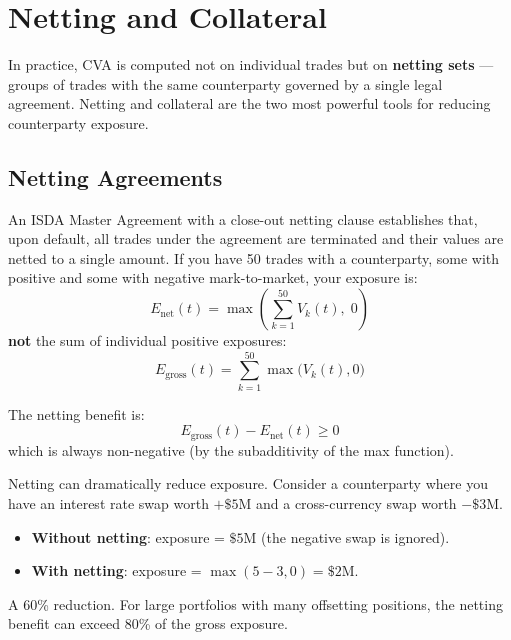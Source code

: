 \documentclass[11pt, a4paper]{article}
\theoremstyle{definition}
\theoremstyle{plain}
\theoremstyle{remark}
\begin{document}
\section{Netting and Collateral}
\label{sec:netting-collateral}

In practice, CVA is computed not on individual trades but on \textbf{netting sets} ---
groups of trades with the same counterparty governed by a single legal agreement.
Netting and collateral are the two most powerful tools for reducing counterparty exposure.

\subsection{Netting Agreements}

An ISDA Master Agreement with a close-out netting clause establishes that, upon default,
all trades under the agreement are terminated and their values are netted to a
single amount.
If you have 50 trades with a counterparty, some with positive and some with negative
mark-to-market, your exposure is:
\[
    E_{\text{net}}(t) = \max\!\left(\sum_{k=1}^{50} V_k(t),\; 0\right)
\]
\textbf{not} the sum of individual positive exposures:
\[
    E_{\text{gross}}(t) = \sum_{k=1}^{50} \max\bigl(V_k(t), 0\bigr)
\]

The netting benefit is:
\[
    E_{\text{gross}}(t) - E_{\text{net}}(t) \geq 0
\]
which is always non-negative (by the subadditivity of the max function).

\begin{keyidea}
Netting can dramatically reduce exposure.
Consider a counterparty where you have an interest rate swap worth $+\$5$M
and a cross-currency swap worth $-\$3$M\@.
\begin{itemize}
    \item \textbf{Without netting}: exposure = $\$5$M (the negative swap is ignored).
    \item \textbf{With netting}: exposure = $\max(5 - 3, 0) = \$2$M\@.
\end{itemize}
A 60\% reduction.
For large portfolios with many offsetting positions, the netting benefit
can exceed 80\% of the gross exposure.
\end{keyidea}
\end{document}
